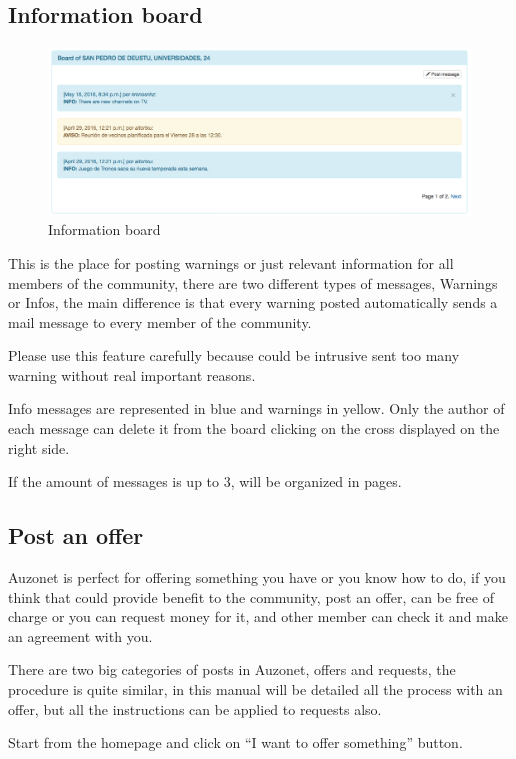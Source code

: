 \documentclass{DeustoFDP}
\begin{document}
\subsection{Information board}
\begin{figure}[h!]
\centering
\includegraphics[width=0.7\linewidth]{fig/board}
\caption[Information board]{Information board}
\label{fig:board}
\end{figure}

This is the place for posting warnings or just relevant information for all members of the community, there are two different types of messages, Warnings or Infos, the main difference is that every warning posted automatically sends a mail message to every member of the community.

Please use this feature carefully because could be intrusive sent too many warning without real important reasons.

Info messages are represented in blue and warnings in yellow. Only the author of each message can delete it from the board clicking on the cross displayed on the right side.

If the amount of messages is up to 3, will be organized in pages.

\subsection{Post an offer}
Auzonet is perfect for offering something you have or you know how to do, if you think that could provide benefit to the community, post an offer, can be free of charge or you can request money for it, and other member can check it and make an agreement with you.

There are two big categories of posts in Auzonet, offers and requests, the procedure is quite similar, in this manual will be detailed all the process with an offer, but all the instructions can be applied to requests also.

Start from the homepage and click on “I want to offer something” button.
\end{document}
